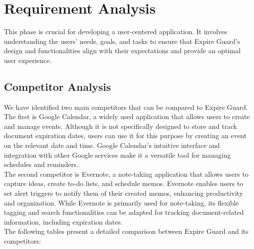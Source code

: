 \section{Requirement Analysis}
This phase is crucial for developing a user-centered application. It involves understanding the users' needs, goals, and tasks to ensure that Expire Guard's design and functionalities align with their expectations and provide an optimal user experience.
\subsection{Competitor Analysis}
We have identified two main competitors that can be compared to Expire Guard. The first  is Google Calendar, a widely used application that allows users to create and manage events. Although it is not specifically designed to store and track document expiration dates, users can use it for this purpose by creating an event on the relevant date and time. Google Calendar's intuitive interface and integration with other Google services make it a versatile tool for managing schedules and reminders.\\
The second competitor is Evernote, a note-taking application that allows users to capture ideas, create to-do lists, and schedule memos. Evernote enables users to set alert triggers to notify them of their created memos, enhancing productivity and organization. While Evernote is primarily used for note-taking, its flexible tagging and search functionalities can be adapted for tracking document-related information, including expiration dates.\\
The following tables present a detailed comparison between Expire Guard and its competitors:\\
